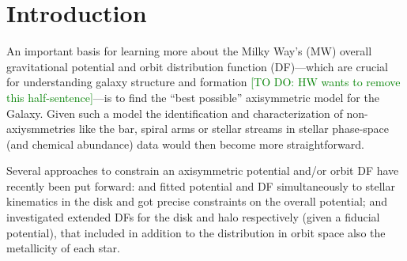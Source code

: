 \documentclass[iop,revtex4,numberedappendix,appendixfloats]{emulateapj}
\newcommand{\HW}[1]{\textcolor{Green}{#1}}
\begin{document}
\section{Introduction}

An important basis for learning more about the Milky Way's (MW) overall gravitational potential and orbit distribution function (DF)---which are crucial for understanding galaxy structure and formation \citep{2013A&ARv..21...61R} \HW{[TO DO: HW wants to remove this half-sentence]}---is to find the ``best possible'' axisymmetric model for the Galaxy. Given such a model the identification and characterization of non-axiysmmetries like the bar, spiral arms or stellar streams in stellar phase-space (and chemical abundance) data would then become more straightforward.

Several approaches to constrain an axisymmetric potential and/or orbit DF have recently been put forward: \citet{2013ApJ...779..115B} and \citet{2014MNRAS.445.3133P} fitted potential and DF simultaneously to stellar kinematics in the disk and got precise constraints on the overall potential; \citet{2015MNRAS.449.3479S} and \citet{2016MNRAS.460.1725D} investigated extended DFs for the disk and halo respectively (given a fiducial potential), that included in addition to the distribution in orbit space also the metallicity of each star. 
\end{document}
